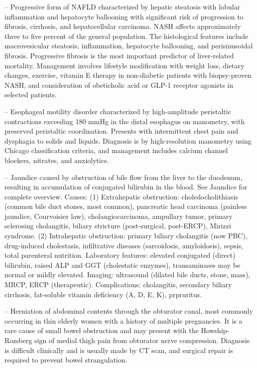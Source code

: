 -- Progressive form of NAFLD characterized by hepatic steatosis with lobular inflammation and hepatocyte ballooning with significant risk of progression to fibrosis, cirrhosis, and hepatocellular carcinoma. NASH affects approximately three to five percent of the general population. The histological features include macrovesicular steatosis, inflammation, hepatocyte ballooning, and perisinusoidal fibrosis. Progressive fibrosis is the most important predictor of liver-related mortality. Management involves lifestyle modification with weight loss, dietary changes, exercise, vitamin E therapy in non-diabetic patients with biopsy-proven NASH, and consideration of obeticholic acid or GLP-1 receptor agonists in selected patients.

-- Esophageal motility disorder characterized by high-amplitude peristaltic contractions exceeding 180 mmHg in the distal esophagus on manometry, with preserved peristaltic coordination. Presents with intermittent chest pain and dysphagia to solids and liquids. Diagnosis is by high-resolution manometry using Chicago classification criteria, and management includes calcium channel blockers, nitrates, and anxiolytics.

-- Jaundice caused by obstruction of bile flow from the liver to the duodenum, resulting in accumulation of conjugated bilirubin in the blood. See Jaundice for complete overview. Causes: (1) Extrahepatic obstruction: choledocholithiasis (common bile duct stones, most common), pancreatic head carcinoma (painless jaundice, Courvoisier law), cholangiocarcinoma, ampullary tumor, primary sclerosing cholangitis, biliary stricture (post-surgical, post-ERCP), Mirizzi syndrome. (2) Intrahepatic obstruction: primary biliary cholangitis (now PBC), drug-induced cholestasis, infiltrative diseases (sarcoidosis, amyloidosis), sepsis, total parenteral nutrition. Laboratory features: elevated conjugated (direct) bilirubin, raised ALP and GGT (cholestatic enzymes), transaminases may be normal or mildly elevated. Imaging: ultrasound (dilated bile ducts, stone, mass), MRCP, ERCP (therapeutic). Complications: cholangitis, secondary biliary cirrhosis, fat-soluble vitamin deficiency (A, D, E, K), prpruritus.

-- Herniation of abdominal contents through the obturator canal, most commonly occurring in thin elderly women with a history of multiple pregnancies. It is a rare cause of small bowel obstruction and may present with the Howship-Romberg sign of medial thigh pain from obturator nerve compression. Diagnosis is difficult clinically and is usually made by CT scan, and surgical repair is required to prevent bowel strangulation.

